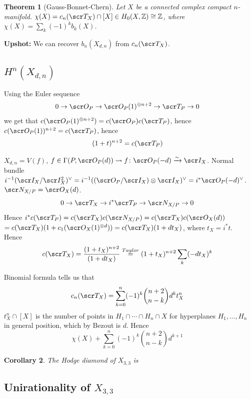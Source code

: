 \documentclass[A4paper, british, reqno]{amsart}
\theoremstyle{darkgreentheorem}
\newtheorem{thm}{Theorem}[section]
\newtheorem{cor}[thm]{Corollary}
\theoremstyle{darkbluedefinition}
\theoremstyle{darkredexample}
\theoremstyle{remark}
\newcommand{\1}{\mathbbm{1}}
\newcommand{\ot}{\otimes}
\newcommand{\op}{\oplus}
\newcommand{\dual}{^{\vee}}
\begin{document}
\begin{thm}[Gauss-Bonnet-Chern]
    Let $X$ be a connected complex compact $n$-manifold.
    $\chi(X)=c_{n}(\sT_{X})\cap [X]\in H_{0}(X,\Z)\cong \Z$, where $\chi(X)=\sum_{k}(-1)^{k}b_{k}(X)$.
\end{thm}

\textbf{Upshot:}
We can recover $b_{n}(X_{d,n})$ from $c_{n}(\sT_{X})$.

\subsection{$H^{n}(X_{d,n})$}

Using the Euler sequence
\[ 0\to \O_{P}\to \O_{P}(1)^{\op n+2}\to \sT_{P}\to 0\]
we get that $c(\O_{P}(1)^{\op n+2})=c(\O_{P})c(\sT_{P})$, hence $c(\O_{P}(1))^{n+2}=c(\sT_{P})$, hence
\[ (1+t)^{n+2}=c(\sT_{P}) \]

$X_{d,n}=V(f)$, $f\in \Gamma(P,\O_{P}(d)) \rightsquigarrow f\colon \O_{P}(-d)\xrightarrow{\sim} \I_{X}$.
Normal bundle $i^{-1}(\I_{X}/\I_{X}^{2})\dual=i^{-1}((\O_{P}/\I_{X})\ot \I_{X})\dual=i^{*}\O_{P}(-d)\dual$.
$\sN_{X/P}=\O_{X}(d)$.
\[ 0\to \sT_{X}\to i^{*}\sT_{P}\to \sN_{X/P}\to 0\]
Hence $i^{*}c(\sT_{P})=c(\sT_{X})c(\sN_{X/P})=c(\sT_{X})c(\O_{X}(d))$
$=c(\sT_{X})(1+c_{1}(\O_{X}(1)^{\ot d}))=c(\sT_{X})(1+dt_{X})$, where $t_{X}=i^{*}t$.
Hence
\[ c(\sT_{X})=\frac{(1+t_{X})^{n+2}}{(1+dt_{X})}\overset{Taylor}{=}(1+t_{X})^{n+2}\sum_{k}(-dt_{X})^{k} \]

Binomial formula tells us that 
\[ c_{n}(\sT_{X})=\sum_{k=0}^{n}(-1)^{k}{{n+2}\choose{n-k}}d^{k}t_{X}^{n} \]
$t_{X}^{n}\cap [X]$ is the number of points in $H_{1}\cap \cdots \cap H_{n}\cap X$ for hyperplanes $H_{1},\ldots,H_{n}$ in general position, which by Bezout is $d$.
Hence
\[ \chi(X)+\sum_{k=0}^{n}(-1)^{k}{{n+2}\choose{n-k}}d^{k+1} \]

\begin{cor}
    The Hodge diamond of $X_{3,3}$ is
    \begin{center}
    \end{center}
\end{cor}

\subsection{Unirationality of $X_{3,3}$}
\end{document}
